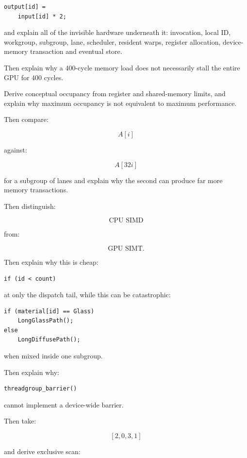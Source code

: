 \protect{}\label{d6k0c3}%
\begin{verbatim}
output[id] =
    input[id] * 2;
\end{verbatim}

and explain all of the invisible hardware underneath it: invocation, local ID, workgroup, subgroup, lane, scheduler, resident warps, register allocation, device-memory transaction and eventual store.

Then explain why a 400-cycle memory load does not necessarily stall the entire GPU for 400 cycles.

Derive conceptual occupancy from register and shared-memory limits, and explain why maximum occupancy is not equivalent to maximum performance.

Then compare:

\[
A[i]
\]

against:

\[
A[32i]
\]

for a subgroup of lanes and explain why the second can produce far more memory transactions.

Then distinguish:

\[
\text{CPU SIMD}
\]

from:

\[
\text{GPU SIMT}.
\]

Then explain why this is cheap:

\protect{}\label{lgnm0f}%
\begin{verbatim}
if (id < count)
\end{verbatim}

at only the dispatch tail, while this can be catastrophic:

\protect{}\label{nhzbj0}%
\begin{verbatim}
if (material[id] == Glass)
    LongGlassPath();
else
    LongDiffusePath();
\end{verbatim}

when mixed inside one subgroup.

Then explain why:

\protect{}\label{hbs55l}%
\begin{verbatim}
threadgroup_barrier()
\end{verbatim}

cannot implement a device-wide barrier.

Then take:

\[
[2,0,3,1]
\]

and derive exclusive scan:

